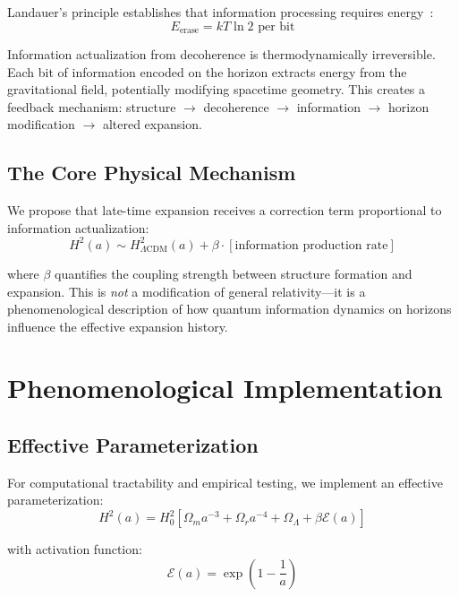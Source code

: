 \documentclass[twocolumn,superscriptaddress,prl,amsmath,amssymb]{revtex4-2}
\begin{document}
Landauer's principle establishes that information processing requires energy~\cite{Landauer1961}:
\begin{equation}
E_{\text{erase}} = kT \ln 2 \text{ per bit}
\end{equation}

Information actualization from decoherence is thermodynamically irreversible. Each bit of information encoded on the horizon extracts energy from the gravitational field, potentially modifying spacetime geometry. This creates a feedback mechanism: structure $\to$ decoherence $\to$ information $\to$ horizon modification $\to$ altered expansion.

\subsection{The Core Physical Mechanism}

We propose that late-time expansion receives a correction term proportional to information actualization:
\begin{equation}
H^2(a) \sim H^2_{\Lambda\text{CDM}}(a) + \beta \cdot [\text{information production rate}]
\label{eq:conceptual}
\end{equation}

where $\beta$ quantifies the coupling strength between structure formation and expansion. This is \textit{not} a modification of general relativity—it is a phenomenological description of how quantum information dynamics on horizons influence the effective expansion history.

\section{Phenomenological Implementation}

\subsection{Effective Parameterization}

For computational tractability and empirical testing, we implement an effective parameterization:
\begin{equation}
H^2(a) = H_0^2[\Omega_m a^{-3} + \Omega_r a^{-4} + \Omega_\Lambda + \beta \mathcal{E}(a)]
\label{eq:H_eff}
\end{equation}

with activation function:
\begin{equation}
\mathcal{E}(a) = \exp\left(1 - \frac{1}{a}\right)
\label{eq:activation}
\end{equation}
\end{document}
